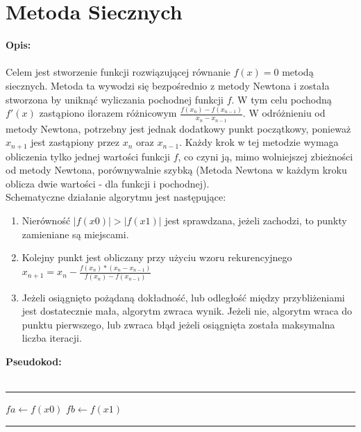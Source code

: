 \documentclass{article}
\begin{document}
\section*{Metoda Siecznych}
\noindent \textbf{Opis: }\\\\
Celem jest stworzenie funkcji rozwiązującej równanie $f(x) =0$ metodą siecznych. Metoda ta wywodzi się bezpośrednio z metody Newtona i została stworzona by uniknąć wyliczania pochodnej funkcji $f$. W tym celu pochodną $f'(x)$ zastąpiono ilorazem różnicowym $\frac{f(x_{n})-f(x_{n-1})}{x_{n} - x_{n-1}}$. W odróżnieniu od metody Newtona, potrzebny jest jednak dodatkowy punkt początkowy, ponieważ $x_{n+1}$ jest zastąpiony przez $x_{n}$ oraz $x_{n-1}$. Każdy krok w tej metodzie wymaga obliczenia tylko jednej wartości funkcji $f$, co czyni ją, mimo wolniejszej zbieżności od metody Newtona, porównywalnie szybką (Metoda Newtona w każdym kroku oblicza dwie wartości - dla funkcji i pochodnej).\\
Schematyczne działanie algorytmu jest następujące: 
\begin{enumerate}
	\item  Nierówność $|f(x0)| > |f(x1)|$ jest sprawdzana, jeżeli zachodzi, to punkty zamieniane są miejscami.
	\item  Kolejny punkt jest obliczany przy użyciu wzoru rekurencyjnego $x_{n+1} = x_{n} - \frac{f(x_{n})*(x_{n}-x_{n-1})}{f(x_{n}) - f(x_{n-1})}$
	\item Jeżeli osiągnięto pożądaną dokładność, lub odległość między przybliżeniami jest dostatecznie mała, algorytm zwraca wynik. Jeżeli nie, algorytm wraca do punktu pierwszego, lub zwraca błąd jeżeli osiągnięta została maksymalna liczba iteracji. 
\end{enumerate}
\noindent \textbf{Pseudokod: }\\\\  
\rule{\textwidth}{0.4pt}
\begin{algorithm}[H]
	\vspace{0.3cm}
	$fa \leftarrow f(x0)$\;
	$fb \leftarrow f(x1)$\;
\end{algorithm}
\hrule
\end{document}
